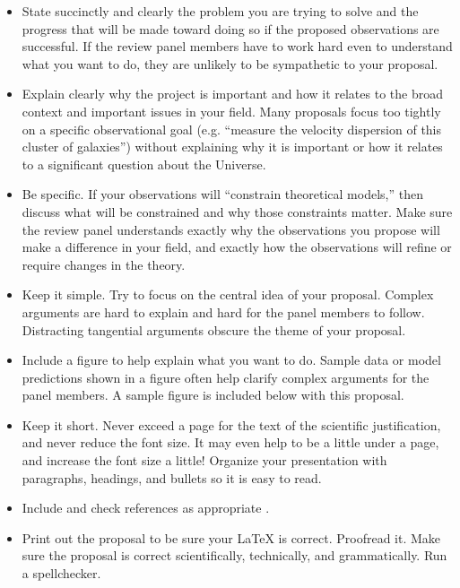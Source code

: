 \documentclass[11pt]{article}
\begin{document}
\begin{itemize}
\item
State succinctly and clearly the problem you are trying to solve
and the progress that will be made toward doing so if the proposed
observations are successful.  If the review panel members have to work hard
even to understand what you want to do, they are unlikely to be
sympathetic to your proposal.

\item
Explain clearly why the project is important and how it
relates to the broad context and important issues in your field.
Many proposals focus too tightly on a specific observational
goal (e.g. ``measure the velocity dispersion of this cluster of galaxies'')
without explaining why it is important or how it relates to a
significant question about the Universe.

\item
Be specific.  If your observations will ``constrain theoretical
models,'' then discuss what will be constrained and why those
constraints matter.  Make sure the review panel understands exactly why
the observations you propose will make a difference in your field,
and exactly how the observations will refine or
require changes in the theory.

\item
Keep it simple.  Try to focus on the central idea of your proposal.
Complex arguments are hard to explain and hard for the panel members to follow.
Distracting tangential arguments obscure the theme of your proposal.

\item
Include a figure to help explain what you want to do.  Sample
data or model predictions shown in a figure often help clarify
complex arguments for the panel members.  A sample figure is included
below with this proposal.

\item
Keep it short.  Never exceed a page for the text of the scientific
justification, and never reduce the font size.  It may even help to
be a little under a page, and increase the font size a little!
Organize your presentation with paragraphs, headings, and bullets
so it is easy to read.

\item
Include and check references as appropriate \citep{Bell96}.

\item
Print out the proposal to be sure your LaTeX is correct.
Proofread it.  Make sure the proposal is correct scientifically,
technically, and grammatically.  Run a spellchecker.

\end{itemize}
\end{document}
